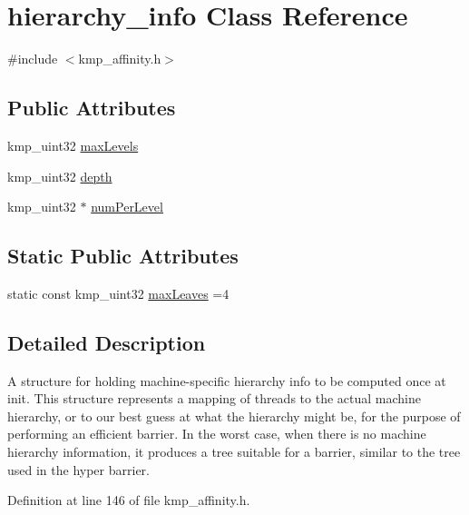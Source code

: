 \hypertarget{classhierarchy__info}{\section{hierarchy\-\_\-info Class Reference}
\label{classhierarchy__info}
}


{\ttfamily \#include $<$kmp\-\_\-affinity.\-h$>$}

\subsection*{Public Attributes}
\begin{DoxyCompactItemize}
\item 
kmp\-\_\-uint32 \hyperlink{classhierarchy__info_aafbad4b89a239ea459aaef1ab4908aba}{max\-Levels}
\item 
kmp\-\_\-uint32 \hyperlink{classhierarchy__info_aeebcad75a7d471e1b1fd37aab6216f22}{depth}
\item 
kmp\-\_\-uint32 $\ast$ \hyperlink{classhierarchy__info_a12fc455d853883d91e3a19567aaac3fe}{num\-Per\-Level}
\end{DoxyCompactItemize}
\subsection*{Static Public Attributes}
\begin{DoxyCompactItemize}
\item 
static const kmp\-\_\-uint32 \hyperlink{classhierarchy__info_a4122e10b5d763f2ca3f13076f836ddfe}{max\-Leaves} =4
\end{DoxyCompactItemize}


\subsection{Detailed Description}
A structure for holding machine-\/specific hierarchy info to be computed once at init. This structure represents a mapping of threads to the actual machine hierarchy, or to our best guess at what the hierarchy might be, for the purpose of performing an efficient barrier. In the worst case, when there is no machine hierarchy information, it produces a tree suitable for a barrier, similar to the tree used in the hyper barrier. 

Definition at line 146 of file kmp\-\_\-affinity.\-h.



